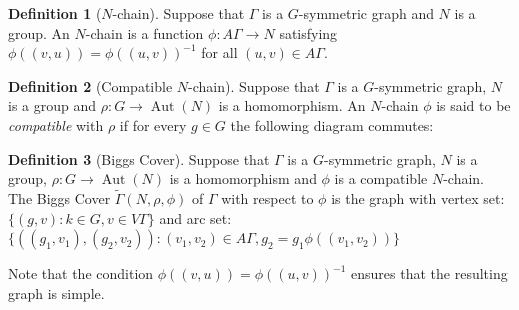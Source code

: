 \documentclass[12pt]{amsart}
\theoremstyle{plain}
\theoremstyle{definition}
\newtheorem{definition}{Definition}
\theoremstyle{remark}
\DeclareMathOperator{\Aut}{Aut}
\begin{document}
\begin{definition} [$N$-chain]
Suppose that $\Gamma$ is a $G$-symmetric graph and $N$ is a group.
An $N$-chain is a function $\phi : A \Gamma \to N$ 
satisfying $\phi((v,u)) = \phi((u,v))^{-1}$ for all $(u,v) \in A \Gamma$.
\end{definition}

\begin{definition} [Compatible $N$-chain]
Suppose that $\Gamma$ is a $G$-symmetric graph, $N$ is a group
and $\rho : G \to \Aut(N)$ is a homomorphism.
An $N$-chain $\phi$ is said to be {\it compatible} with $\rho$
if for every $g \in G$ the following diagram commutes:

\centerline{
}
\end{definition}

\begin{definition}[Biggs Cover]
Suppose that $\Gamma$ is a $G$-symmetric graph, $N$ is a group,
$\rho : G \to \Aut(N)$ is a homomorphism and $\phi$ is a compatible $N$-chain.
The Biggs Cover $\widetilde{\Gamma}(N,\rho,\phi)$
of $\Gamma$ with respect to $\phi$ is the graph 
with vertex set: 
$\{ (g,v) : k \in G, v \in V \Gamma \}$
and arc set: 
$ \{ ((g_1,v_1),(g_2,v_2)) : (v_1,v_2) \in A \Gamma, g_2 = g_1 \phi((v_1,v_2)) \}$
\end{definition}

Note that the condition $\phi((v,u)) = \phi((u,v))^{-1}$ ensures that the resulting 
graph is simple.
\end{document}
